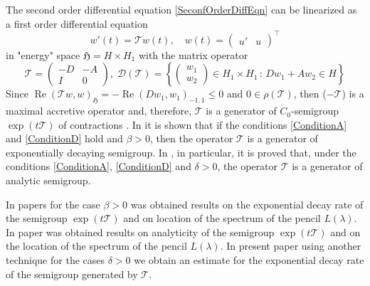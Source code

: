 \documentclass[12pt, reqno]{amsart}
\theoremstyle{plain}
\begin{document}
The second order differential equation \eqref{SeconfOrderDiffEqn} can be linearized as a first order
differential equation \cite{HrynivShkalikov04,Huang97,JacobTrunk09}
\begin{equation}\label{FirstOrderSystem}
 w'(t)={{\mathcal{T} }} w(t), \quad w(t)=\begin{pmatrix} u' & u \end{pmatrix}^\top
\end{equation} 
in "energy" space ${{\mathfrak H}}=H\times H_1$ with the matrix operator 
 \[
    {{\mathcal{T} }}=\begin{pmatrix}
     -D & -A \\ {{I}} & 0
    \end{pmatrix},\;
    {{\mathcal D}}({{\mathcal{T} }})=\left\{\begin{pmatrix} w_1 \\ w_2 \end{pmatrix}\in H_1\times H_1\,:\,
    D w_1+A w_2\in H
    \right\}
 \]
Since ${\operatorname{Re}}({{\mathcal{T} }} w,w)_{{\mathfrak H}}=-{\operatorname{Re}}(Dw_1,w_1)_{-1,1}\leq0$ and $0\in\rho({{\mathcal{T} }})$, then ($-{{\mathcal{T} }}$) is a maximal
accretive operator and, therefore, ${{\mathcal{T} }}$ is a generator of $C_0$-semigroup  $\exp(t{{\mathcal{T} }})$ of contractions
\cite{EngelNagel2000}. In \cite{HrynivShkalikov04} it is shown that if the conditions \ref{ConditionA} and
\ref{ConditionD} hold and $\beta>0$, then the operator ${{\mathcal{T} }}$ is a generator of exponentially decaying semigroup. 
In \cite{HrynivShkalikov99}, in particular, it is  proved that, under the conditions \ref{ConditionA},
\ref{ConditionD} and $\delta>0$, the operator ${{\mathcal{T} }}$ is a generator of analytic semigroup.

In papers \cite{BatkaiEngel04, Huang97} for the case $\beta>0$ was obtained results on the exponential decay rate of the
semigroup  $\exp(t{{\mathcal{T} }})$ and on location of the spectrum of the pencil $L(\lambda)$. In paper \cite{JacobTrunk09} was obtained
results on analyticity of the semigroup $\exp(t{{\mathcal{T} }})$ and on the location of the spectrum of the pencil $L(\lambda)$.
In present paper using another technique for the cases $\delta>0$ we obtain an estimate for the exponential decay rate of
the semigroup generated by ${{\mathcal{T} }}$.
\end{document}
